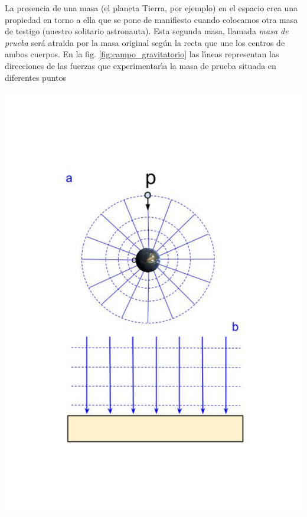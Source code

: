 La presencia de una masa (el planeta Tierra, por ejemplo) en el espacio crea una propiedad en torno a ella que se pone de manifiesto cuando colocamos otra masa de testigo (nuestro solitario astronauta). Esta segunda masa, llamada \emph{masa de prueba} ser\'a atraida por la masa original seg\'un la recta que une los centros de ambos cuerpos. En la fig. \ref{fig:campo_gravitatorio} las l\'\i{}neas representan las direcciones de las fuerzas que experimentar\'\i{}a la masa de prueba situada en diferentes puntos
\begin{marginfigure}
  \includegraphics[width=\linewidth]{campo_gravitatorio.pdf}
  \caption{Representaci\'on del campo gravitatorio terrestre. Las l\'\i{}neas cont\'\i{}nuas representan las l\'\i{}ineas de campo. Los c\'\i{}rculos discont\'\i{}nuos son las superficies equipotenciales. En puntos suficientemente alejados de la Tierra (a) las l\'\i{}neas de campo se van separando a medida que la intensidad del campo decrece. En la superficie de la Tierra (b) la intesidad del campo es pr\'acticamente constante.}
  \label{fig:campo_gravitatorio}
\end{marginfigure}
